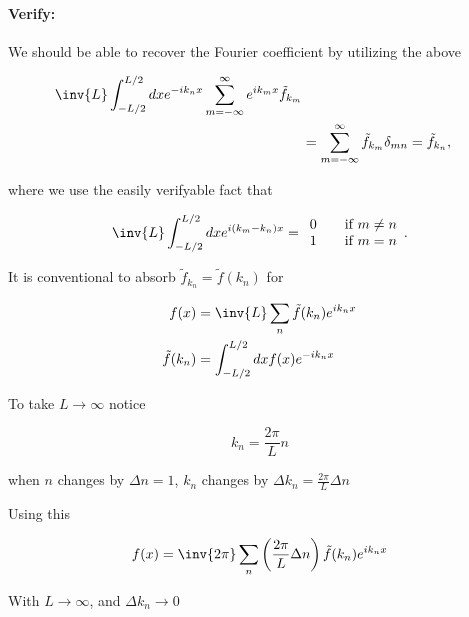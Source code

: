 \paragraph{Verify:}

We should be able to recover the Fourier coefficient by utilizing the above

\begin{align*}
\inv{L} \int_{-L/2}^{L/2} dx e^{-i k_n x} \sum_{m=-\infty}^\infty e^{i k_m x} \tilde{f}_{k_m} \\
&= \sum_{m = -\infty}^\infty \tilde{f}_{k_m} \delta_{mn} = \tilde{f}_{k_n},
\end{align*}

where we use the easily verifyable fact that 

\begin{equation}\label{eqn:relativisticElectrodynamicsL15:800}
\inv{L} \int_{-L/2}^{L/2} dx e^{i (k_m - k_n) x} = 
\begin{array}{l l}
0 & \quad \mbox{if $m \ne n$} \\
1 & \quad \mbox{if $m = n$} \\
\end{array}.
\end{equation}

It is conventional to absorb $\tilde{f}_{k_n} = \tilde{f}(k_n)$ for

\begin{align}\label{eqn:relativisticElectrodynamicsL15:330}
f(x) &= \inv{L} \sum_n \tilde{f}(k_n) e^{i k_n x} \\
\tilde{f}(k_n) &= \int_{-L/2}^{L/2} dx f(x) e^{-i k_n x}
\end{align}

To take $L \rightarrow \infty$ notice

\begin{equation}\label{eqn:relativisticElectrodynamicsL15:350}
k_n = \frac{2 \pi}{L} n
\end{equation}

when $n$ changes by $\Delta n = 1$, $k_n$ changes by $\Delta k_n = \frac{2 \pi}{L} \Delta n$

Using this 

\begin{equation}\label{eqn:relativisticElectrodynamicsL15:370}
f(x) = \inv{2\pi} \sum_n \left( \frac{2\pi}{L} \Delta n \right) \tilde{f}(k_n) e^{i k_n x}
\end{equation}

With $L \rightarrow \infty$, and $\Delta k_n \rightarrow 0$

